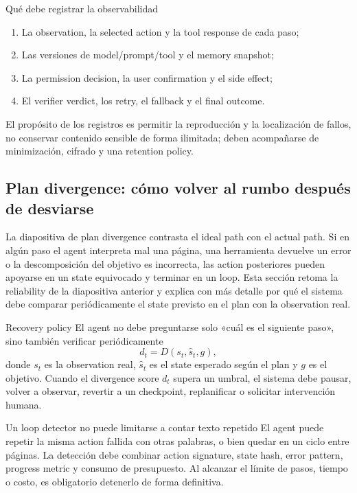 \begin{knowledgebox}{Qué debe registrar la observabilidad}
\begin{enumerate}
  \item La observation, la selected action y la tool response de cada paso;
  \item Las versiones de model/prompt/tool y el memory snapshot;
  \item La permission decision, la user confirmation y el side effect;
  \item El verifier verdict, los retry, el fallback y el final outcome.
\end{enumerate}
El propósito de los registros es permitir la reproducción y la localización de fallos, no conservar contenido sensible de forma ilimitada; deben acompañarse de minimización, cifrado y una retention policy.
\end{knowledgebox}

\subsection{Plan divergence: cómo volver al rumbo después de desviarse}

La diapositiva de plan divergence contrasta el ideal path con el actual path. Si en algún paso el agent interpreta mal una página, una herramienta devuelve un error o la descomposición del objetivo es incorrecta, las action posteriores pueden apoyarse en un state equivocado y terminar en un loop. Esta sección retoma la reliability de la diapositiva anterior y explica con más detalle por qué el sistema debe comparar periódicamente el state previsto en el plan con la observation real.


\begin{importantbox}{Recovery policy}
El agent no debe preguntarse solo «cuál es el siguiente paso», sino también verificar periódicamente
\[
d_t=D(s_t,\hat{s}_t,g),
\]
donde $s_t$ es la observation real, $\hat{s}_t$ es el state esperado según el plan y $g$ es el objetivo. Cuando el divergence score $d_t$ supera un umbral, el sistema debe pausar, volver a observar, revertir a un checkpoint, replanificar o solicitar intervención humana.
\end{importantbox}

\begin{warningbox}{Un loop detector no puede limitarse a contar texto repetido}
El agent puede repetir la misma action fallida con otras palabras, o bien quedar en un ciclo entre páginas. La detección debe combinar action signature, state hash, error pattern, progress metric y consumo de presupuesto. Al alcanzar el límite de pasos, tiempo o costo, es obligatorio detenerlo de forma definitiva.
\end{warningbox}

